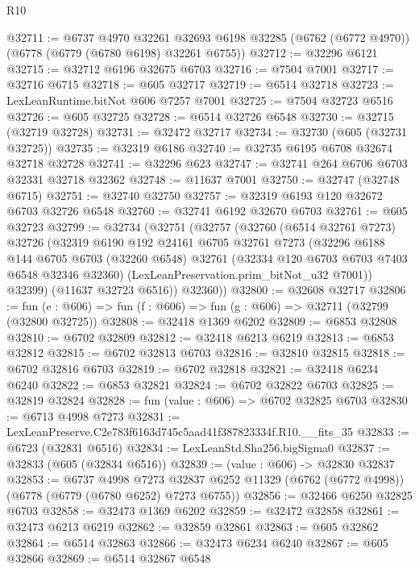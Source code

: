 \begin{lexlean}{R10}
\begin{coremodule}
@32711 := @6737
    @4970
    @32261
    @32693
    @6198
    @32285
    (@6762 (@6772 @4970))
    (@6778 (@6779 (@6780 @6198) @32261 @6755))
@32712 := @32296 @6121
@32715 := @32712 @6196 @32675 @6703
@32716 := @7504 @7001
@32717 := @32716 @6715
@32718 := @605 @32717
@32719 := @6514 @32718
@32723 := LexLeanRuntime.bitNot @606 @7257 @7001
@32725 := @7504 @32723 @6516
@32726 := @605 @32725
@32728 := @6514 @32726 @6548
@32730 := @32715 (@32719 @32728)
@32731 := @32472 @32717
@32734 := @32730 (@605 (@32731 @32725))
@32735 := @32319 @6186
@32740 := @32735 @6195 @6708 @32674 @32718 @32728
@32741 := @32296 @623
@32747 := @32741 @264 @6706 @6703 @32331 @32718 @32362
@32748 := @11637 @7001
@32750 := @32747 (@32748 @6715)
@32751 := @32740 @32750
@32757 := @32319 @6193 @120 @32672 @6703 @32726 @6548
@32760 := @32741 @6192 @32670 @6703
@32761 := @605 @32723
@32799 := @32734
    (@32751
      (@32757
        (@32760
          (@6514 @32761 @7273)
          @32726
          (@32319
            @6190
            @192
            @24161
            @6705
            @32761
            @7273
            (@32296
              @6188
              @144
              @6705
              @6703
              (@32260 @6548)
              @32761
              (@32334 @120 @6703 @6703 @7403 @6548 @32346 @32360)
              (LexLeanPreservation.prim_bitNot_u32 @7001))
            @32399)
          (@11637 @32723 @6516))
        @32360))
@32800 := @32608 @32717
@32806 := fun (e : @606) => fun (f : @606) => fun (g : @606) => @32711 (@32799 (@32800 @32725))
@32808 := @32418 @1369 @6202
@32809 := @6853 @32808
@32810 := @6702 @32809
@32812 := @32418 @6213 @6219
@32813 := @6853 @32812
@32815 := @6702 @32813 @6703
@32816 := @32810 @32815
@32818 := @6702 @32816 @6703
@32819 := @6702 @32818
@32821 := @32418 @6234 @6240
@32822 := @6853 @32821
@32824 := @6702 @32822 @6703
@32825 := @32819 @32824
@32828 := fun (value : @606) => @6702 @32825 @6703
@32830 := @6713 @4998 @7273
@32831 := LexLeanPreserve.C2e783f6163d745c5aad41f387823334f.R10.__fits_35
@32833 := @6723 (@32831 @6516)
@32834 := LexLeanStd.Sha256.bigSigma0
@32837 := @32833 (@605 (@32834 @6516))
@32839 := (value : @606) -> @32830 @32837
@32853 := @6737
    @4998
    @7273
    @32837
    @6252
    @11329
    (@6762 (@6772 @4998))
    (@6778 (@6779 (@6780 @6252) @7273 @6755))
@32856 := @32466 @6250 @32825 @6703
@32858 := @32473 @1369 @6202
@32859 := @32472 @32858
@32861 := @32473 @6213 @6219
@32862 := @32859 @32861
@32863 := @605 @32862
@32864 := @6514 @32863
@32866 := @32473 @6234 @6240
@32867 := @605 @32866
@32869 := @6514 @32867 @6548

\end{coremodule}
\end{lexlean}
